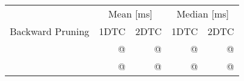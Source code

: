 \begin{tabular}{crrrr}
	\toprule
	                 & \multicolumn{2}{c}{Mean [\si{\milli\second}]} & \multicolumn{2}{c}{Median [\si{\milli\second}]}               \\
	Backward Pruning & 1DTC                                          & 2DTC                                            & 1DTC & 2DTC \\
	\midrule
	\xmark           & @                                             & @                                               & @    & @    \\
	\cmark           & @                                             & @                                               & @    & @    \\
	\bottomrule
\end{tabular}
